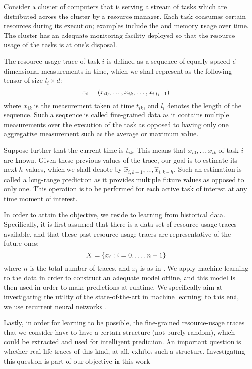Consider a cluster of computers that is serving a stream of tasks which are
distributed across the cluster by a resource manager. Each task consumes certain
resources during its execution; examples include the  and memory usage
over time. The cluster has an adequate monitoring facility deployed so that the
resource usage of the tasks is at one's disposal.

The resource-usage trace of task $i$ is defined as a sequence of equally spaced
$d$-dimensional measurements in time, which we shall represent as the following
tensor of size $l_i \times d$:
\begin{equation} \elab{trace}
  x_i = \left(x_{i0}, \dots, x_{ik}, \dots, x_{i,l_i - 1}\right)
\end{equation}
where $x_{ik}$ is the measurement taken at time $t_{ik}$, and $l_i$ denotes the
length of the sequence. Such a sequence is called fine-grained data as it
contains multiple measurements over the execution of the task as opposed to
having only one aggregative measurement such as the average or maximum value.

Suppose further that the current time is $t_{ik}$. This means that $x_{i0},
\dots, x_{ik}$ of task $i$ are known. Given these previous values of the trace,
our goal is to estimate its next $h$ values, which we shall denote by
$\hat{x}_{i,k + 1}, \dots, \hat{x}_{i,k + h}$. Such an estimation is called a
long-range prediction as it provides multiple future values as opposed to only
one. This operation is to be performed for each active task of interest at any
time moment of interest.

In order to attain the objective, we reside to learning from historical data.
Specifically, it is first assumed that there is a data set of resource-usage
traces available, and that these past resource-usage traces are representative
of the future ones:
\begin{equation} \elab{traces}
  X = \{ x_i: i = 0, \dots, n - 1 \}
\end{equation}
where $n$ is the total number of traces, and $x_i$ is as in . We
apply machine learning to the data in order to construct an adequate model
offline, and this model is then used in order to make predictions at runtime. We
specifically aim at investigating the utility of the state-of-the-art in machine
learning; to this end, we use recurrent neural networks \cite{goodfellow2016}.

Lastly, in order for learning to be possible, the fine-grained resource-usage
traces that we consider have to have a certain structure (not purely random),
which could be extracted and used for intelligent prediction. An important
question is whether real-life traces of this kind, at all, exhibit such a
structure. Investigating this question is part of our objective in this work.
